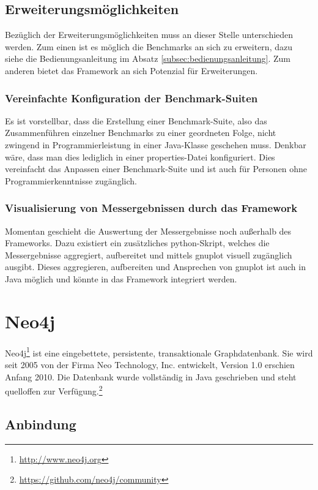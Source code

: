 \documentclass[11pt, a4paper, oneside, twocolumn]{article} %
\begin{document}
\subsection{Erweiterungsmöglichkeiten}

Bezüglich der Erweiterungsmöglichkeiten muss an dieser Stelle unterschieden werden. Zum einen ist es möglich die Benchmarks an sich zu erweitern, dazu siehe die Bedienungsanleitung im Absatz \ref{subsec:bedienungsanleitung}. Zum anderen bietet das Framework an sich Potenzial für Erweiterungen.

\subsubsection*{Vereinfachte Konfiguration der Benchmark-Suiten}
Es ist vorstellbar, dass die Erstellung einer Benchmark-Suite, also das Zusammenführen einzelner Benchmarks zu einer geordneten Folge, nicht zwingend in Programmierleistung in einer Java-Klasse geschehen muss. Denkbar wäre, dass man dies lediglich in einer properties-Datei konfiguriert. Dies vereinfacht das Anpassen einer Benchmark-Suite und ist auch für Personen ohne Programmierkenntnisse zugänglich.

\subsubsection*{Visualisierung von Messergebnissen durch das Framework}
Momentan geschieht die Auswertung der Messergebnisse noch außerhalb des Frameworks. Dazu existiert ein zusätzliches python-Skript, welches die Messergebnisse aggregiert, aufbereitet und mittels gnuplot visuell zugänglich ausgibt. Dieses aggregieren, aufbereiten und Ansprechen von gnuplot ist auch in Java möglich und könnte in das Framework integriert werden.

\section{Neo4j}

Neo4j\footnote{\url{http://www.neo4j.org}} ist eine eingebettete, persistente, transaktionale Graphdatenbank. Sie wird seit 2005 von der Firma Neo Technology, Inc. entwickelt, Version 1.0 erschien Anfang 2010. Die Datenbank wurde vollständig in Java geschrieben und steht quelloffen zur Verfügung.\footnote{\url{https://github.com/neo4j/community}}

\subsection{Anbindung}
\end{document}
